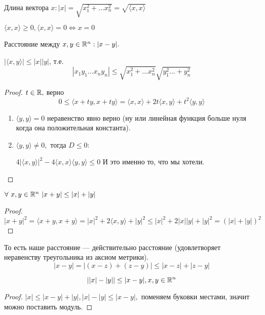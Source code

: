 \documentclass[12pt]{report}
\begin{document}
\begin{defn}
Длина вектора $x: |x| = \sqrt{x_1^2 + \dots x_n^2} = \sqrt{\langle x, x \rangle}$

$\langle x, x \rangle \ge 0, \langle x, x \rangle = 0 \Leftrightarrow x = 0$

Расстояние между $x, y \in \mathbb{R}^n: |x - y|.$
\end{defn}

\begin{thm}
$|\langle x, y \rangle| \le |x||y|$, т.е.
$$|x_1y_1 \dots x_ny_n| \le \sqrt{x_1^2 + \dots x_n^2}\sqrt{y_1^2 \dots + y_n^2}$$
\end{thm}
\begin{proof}
$t \in \mathbb{R}, $ верно 
$$0 \le \langle x + ty, x + ty \rangle = \langle x, x \rangle + 2t\langle x, y \rangle + t^2\langle y, y \rangle$$
\begin{enumerate}
\item $\langle y, y \rangle = 0$ неравенство явно верно (ну или линейная функция больше нуля когда она положительная константа).
\item $\langle y, y \rangle \neq 0,$ тогда $D \le 0:$

$4|\langle x, y \rangle|^2 - 4\langle x, x \rangle \langle y, y \rangle \le 0$
И это именно то, что мы хотели.
\end{enumerate}
\end{proof}

\begin{cor}
$\forall ~x, y \in \mathbb{R}^n ~|x + y| \le |x| + |y|$
\end{cor}
\begin{proof}
$$|x + y|^2 = \langle x + y, x + y \rangle = |x|^2 + 2\langle x, y \rangle + |y|^2 \le |x|^2 + 2|x||y| + |y|^2 = (|x| + |y|)^2$$
\end{proof}

То есть наше расстояние --- действительно расстояние (удовлетворяет неравенству треугольника из аксиом метрики).
$$|x - y| = |(x - z) + (z - y)| \le |x - z| + |z - y|$$

\begin{cor}[2]
$$||x| - |y|| \le |x - y|, x, y \in \mathbb{R}^n$$
\end{cor}
\begin{proof}
$|x| \le |x - y| + |y|, |x| - |y| \le |x - y|,$ поменяем буковки местами, значит можно поставить модуль.
\end{proof}
\end{document}
